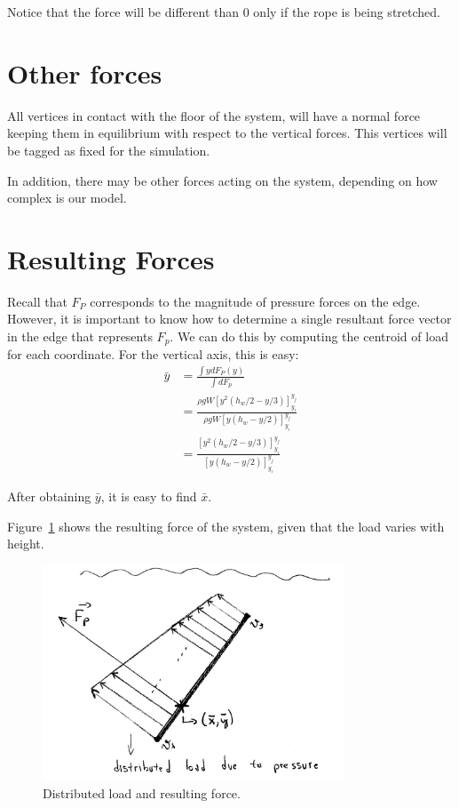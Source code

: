 \documentclass[12pt]{article}
\begin{document}
Notice that the force will be different than $0$ only if the rope is being stretched.

\section{Other forces}
All vertices in contact with the floor of the system, will have a normal force keeping them in equilibrium with respect to the vertical forces. This vertices will be tagged as fixed for the simulation.

In addition, there may be other forces acting on the system, depending on how complex is our model. 



\section{Resulting Forces}
\label{sec:center-of-load}

Recall that $F_P$ corresponds to the magnitude of pressure forces on the edge. However, it is important to know how to determine a single resultant force vector in the edge that represents $F_p$. We can do this by computing the centroid of load for each coordinate. For the vertical axis, this is easy:
\begin{align*}
  \bar y &= \frac{\int y dF_P(y)}{\int dF_p}\\
  &= \frac{\rho g W \left[ y^2 (h_w/2 - y/3)\right]_{y_i}^{y_j}}{\rho g W \left[ y (h_w - y/2) \right]_{y_i}^{y_j}}\\
  &= \frac{\left[ y^2 (h_w/2 - y/3)\right]_{y_i}^{y_j}}{\left[ y (h_w - y/2) \right]_{y_i}^{y_j}}
\end{align*}

After obtaining $\bar y$, it is easy to find $\bar x$.

Figure~\ref{fig:distributed-load} shows the resulting force of the system, given that the load varies with height.
\begin{figure}[hbt]
  \begin{center}
    \includegraphics[width=0.8\textwidth]{distributed-load.png}
  \end{center}
  \caption{Distributed load and resulting force.}
  \label{fig:distributed-load}
\end{figure}
\end{document}
